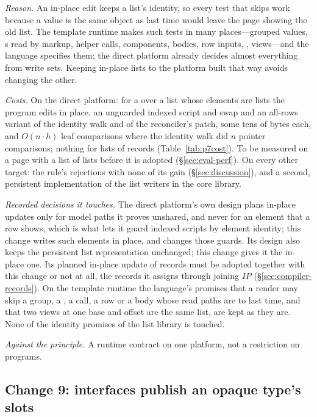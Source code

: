 \emph{Reason.} An in-place edit keeps a list's identity, so every test that skips work because a value is
the same object as last time would leave the page showing the old list. The template runtime makes such
tests in many places---grouped values, s read by markup, helper calls, components, 
bodies, row inputs, , views---and the language specifies them; the direct platform already
decides almost everything from write sets. Keeping in-place lists to the platform built that way avoids
changing the other.

\emph{Costs.} On the direct platform: for a  over a list whose elements are lists the program
edits in place, an unguarded indexed script and swap and an all-rows variant of the identity walk and of the
reconciler's patch, some tens of bytes each, and $O(n \cdot h)$ leaf comparisons where the identity walk
did $n$ pointer comparisons; nothing for lists of records (Table~\ref{tab:p7cost}). To be measured on a page
with a list of lists before it is adopted (\S\ref{sec:eval-perf}). On every other target: the rule's
rejections with none of its gain (\S\ref{sec:discussion}), and a second, persistent implementation of the
list writers in the core library.

\emph{Recorded decisions it touches.} The direct platform's own design plans in-place updates only for model
paths it proves unshared, and never for an element that a row shows, which is what lets it guard indexed
scripts by element identity; this change writes such elements in place, and changes those guards. Its
design also keeps the persistent list representation unchanged; this change gives it the in-place one. Its
planned in-place update of records must be adopted together with this change or not at all, the records
it assigns through joining $\mathit{IP}$ (\S\ref{sec:compiler-records}). On the
template runtime the language's promises that a render may skip a group, a , a call, a row or a
 body whose read paths are \code{===} to last time, and that two views at one base and offset are
the same list, are kept as they are. None of the identity promises of the list library is touched.

\emph{Against the principle.} A runtime contract on one platform, not a restriction on programs.

\subsection*{Change 9: interfaces publish an opaque type's slots}

